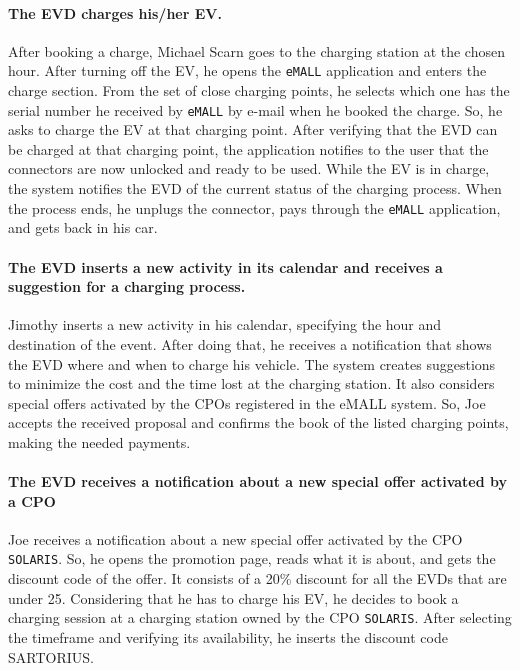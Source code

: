 \paragraph{The EVD charges his/her EV.}
After booking a charge, Michael Scarn goes to the charging station at the chosen hour.
After turning off the EV, he opens the \verb|eMALL| application and enters the charge section.
From the set of close charging points, he selects which one has the serial number he received by \verb|eMALL| by e-mail
when he booked the charge.
So, he asks to charge the EV at that charging point.
After verifying that the EVD can be charged at that charging point, the application notifies to the user that the
connectors are now unlocked and ready to be used.\@
While the EV is in charge, the system notifies the EVD of the current status of the charging process.
When the process ends, he unplugs the connector, pays through the \verb|eMALL| application, and gets back in his car.

\paragraph{The EVD inserts a new activity in its calendar and receives a suggestion for a charging process.}
Jimothy inserts a new activity in his calendar, specifying the hour and destination of the event.
After doing that, he receives a notification that shows the EVD where and when to charge his vehicle.
The system creates suggestions to minimize the cost and the time lost at the charging station.
It also considers special offers activated by the CPOs registered in the eMALL system.
So, Joe accepts the received proposal and confirms the book of the listed charging points, making the needed payments.

\paragraph{The EVD receives a notification about a new special offer activated by a CPO}
Joe receives a notification about a new special offer activated by the CPO \verb|SOLARIS|.
So, he opens the promotion page, reads what it is about, and gets the discount code of the offer.
It consists of a 20\% discount for all the EVDs that are under 25.
Considering that he has to charge his EV, he decides to book a charging session at a charging station owned by the CPO \verb|SOLARIS|.
After selecting the timeframe and verifying its availability, he inserts the discount code SARTORIUS\@.


